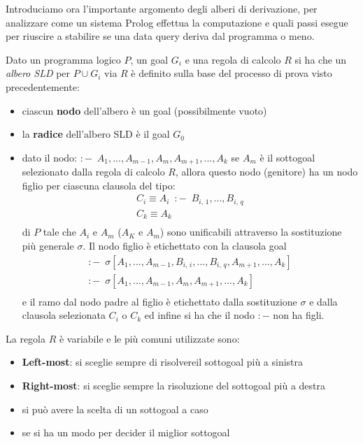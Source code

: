 Introduciamo ora l'importante argomento degli alberi di derivazione, per analizzare come un sistema Prolog effettua la computazione
e quali passi esegue per riuscire a stabilire se una data query deriva dal programma o meno.
\begin{defi}
Dato un programma logico $P$, un goal $G_i$ e una regola di calcolo $R$ si ha che un \textit{albero SLD} per $P\cup G_i$ via $R$
è definito sulla base del processo di prova visto precedentemente:
\begin{itemize}
\item ciascun \textbf{nodo} dell'albero è un goal (possibilmente vuoto)
\item la \textbf{radice }dell'albero SLD è il goal $G_0$
\item dato il nodo: $:-\,\,\, A_1,...,A_{m-1},A_m,A_{m+1},...,A_k$
  se $A_m$ è il sottogoal selezionato dalla regola di calcolo $R$, allora questo nodo (genitore) ha un nodo figlio
  per ciascuna clausola del tipo:
  \begin{equation*}
    \begin{split}
      C_i\equiv A_i\,\,\, :-\,\,\, B_{i,\,1},...,B_{i,\,q}\\
      C_k \equiv A_k \\
    \end{split}
  \end{equation*}
di $P$ tale che $A_i$ e $A_m$ ($A_K$ e $A_m$) sono unificabili attraverso la sostituzione più generale $\sigma$.\newline
Il nodo figlio è etichettato con la clausola goal
\begin{equation*}
\begin{split}
      :-\,\,\,\sigma[A_1,...,A_{m-1},B_{i,\,i},...,B_{i,\,q},A_{m+1},...,A_k]\\
      :-\,\,\,\sigma[A_1,...,A_{m-1},A_m,A_{m+1},...,A_k]\\
\end{split}
\end{equation*}
e il ramo dal nodo padre al figlio è etichettato dalla sostituzione $\sigma$ e dalla clausola selezionata $C_i$ o $C_k$
ed infine si ha che il nodo $:-$ non ha figli.
\end{itemize}
\end{defi}
La regola $R$ è variabile e le più comuni utilizzate sono:
\begin{itemize}
\item \textbf{Left-most}: si sceglie sempre di risolvereil sottogoal più a sinistra
\item \textbf{Right-most}: si sceglie sempre la risoluzione del sottogoal più a destra
\item si può avere la scelta di un sottogoal a caso
\item se si ha un modo per decider il miglior sottogoal
\end{itemize}
